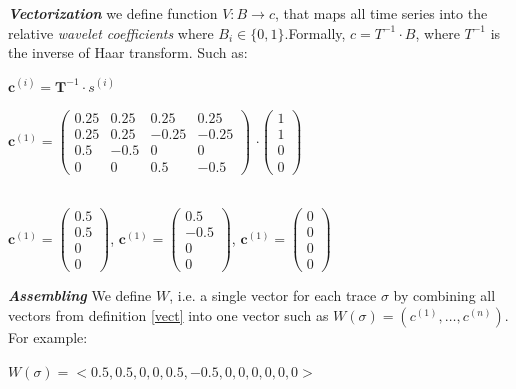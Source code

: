 \begin{definition}{\textit{\textbf{Vectorization}}} \label{vect}
 we define function $V: B \to c$, that maps all time series into the relative \textit{wavelet coefficients}  where $B_i \in \{0,1\}$.Formally, $c = T^{-1} \cdot B$, where $T^{-1}$ is the inverse of Haar transform. Such as:
 
 \begin{center}
 	$\textbf{c}^{(i)} = \textbf{T}^{-1} \cdot s^{(i)}$\\
 	\vline
 	
 	$\textbf{c}^{(1)} = \begin{pmatrix}
 	0.25 & 0.25 & 0.25 & 0.25 \\
 	0.25 & 0.25 & -0.25 & -0.25 \\
 	0.5 & -0.5 & 0 & 0 \\
 	0 & 0 & 0.5 & -0.5  	
 	\end{pmatrix}$ $\cdot  \begin{pmatrix}
 		1 \\
 		1 \\
 		0 \\
 		0  	
 	\end{pmatrix}$\\
 	\vline\\
 	\vline
 	
 	$\textbf{c}^{(1)}=
 	\begin{pmatrix}
 		0.5 \\
 		0.5 \\
 		0 \\
 		0  	
 	\end{pmatrix}$, $\textbf{c}^{(1)}=
 \begin{pmatrix}
 0.5 \\
 -0.5 \\
 0 \\
 0  	
\end{pmatrix}$, $\textbf{c}^{(1)}=
\begin{pmatrix}
0 \\
0 \\
0 \\
0  	
\end{pmatrix} $

 \end{center}

\end{definition}


\begin{definition}{\textit{\textbf{Assembling}}} \label{ass}
	 We define $W$, i.e. a single vector for each trace $\sigma$ by combining all vectors from definition \ref{vect} into one vector such as $W(\sigma) = (c^{(1)}, \dots , c^{(n)}).$ For example:	
	 \begin{center}
	 	$W(\sigma) = <0.5, 0.5, 0, 0, 0.5, -0.5, 0, 0, 0, 0, 0, 0 >$
	 \end{center}
	 
\end{definition}

